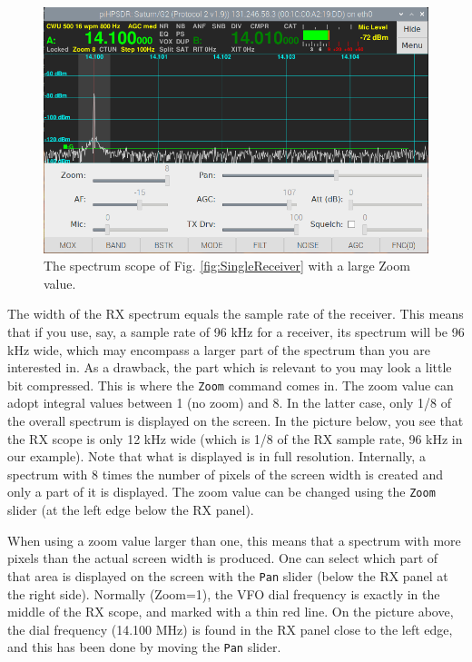 \documentclass[12pt]{book}
\def\rett#1{\texttt{\color{red}#1}}
\def\bltt#1{\texttt{\color{blue}#1}}
\begin{document}
\begin{figure}[ht]
\center
\includegraphics[width=12cm]{ZoomPan.png}
\caption{The spectrum scope of Fig. \ref{fig:SingleReceiver} with a
large Zoom value.}
\end{figure}

The width of the RX spectrum equals the sample rate
of the receiver. This means that if you use, say,
a sample rate of 96 kHz for a receiver, its spectrum
will be 96 kHz wide, which may encompass a larger part
of the spectrum than you are interested in. As a drawback,
the part which is relevant to you may look a little bit
compressed. This is where the \bltt{Zoom} command
comes in. The zoom value can adopt integral values between
1 (no zoom) and 8. In the latter case, only 1/8 of the
overall spectrum is displayed on the screen. In the
picture below, you see that the RX scope is only 12 kHz
wide (which is 1/8 of the RX sample rate, 96 kHz in our
example). Note that what is displayed is in full resolution.
Internally, a spectrum with 8 times the number of pixels
of the screen width is created and only a part of it is
displayed. The zoom value can be changed using the \rett{Zoom}
slider (at the left edge below the RX panel).


When using a zoom value larger than one, this means that
a spectrum with more pixels than the actual screen width
is produced. One can select which part of that area
is displayed on the screen with the \rett{Pan} slider
(below the RX panel at the right side). Normally (Zoom=1),
the VFO dial frequency is exactly in the middle of the
RX scope, and marked with a thin red line. On the picture
above, the dial frequency (14.100 MHz) is found in the RX
panel close to the left edge, and this has been done
by moving the \rett{Pan} slider.

\end{document}
